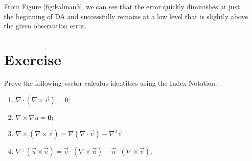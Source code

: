 From Figure \ref{fig:kalman3}, we can see that the error quickly diminishes at just the beginning of DA and successfully remains at a low level that is slightly above the given observation error.

\section{Exercise}

\begin{Exercise}
Prove the following vector calculus identities using the Index Notation.
\begin{enumerate}[label=(\alph*)]
    \item $\nabla \cdot (\nabla \times \vec{v}) = 0$;
    \item $\nabla \times \nabla u = \textbf{0}$;
    \item $\nabla \times (\nabla \times \vec{v}) = \nabla (\nabla \cdot \vec{v}) - \nabla^2 \vec{v}$
    \item $\nabla \cdot (\vec{u} \times \vec{v}) = \vec{v} \cdot (\nabla \times \vec{u}) - \vec{u} \cdot (\nabla \times \vec{v})$.
\end{enumerate}
\end{Exercise}

